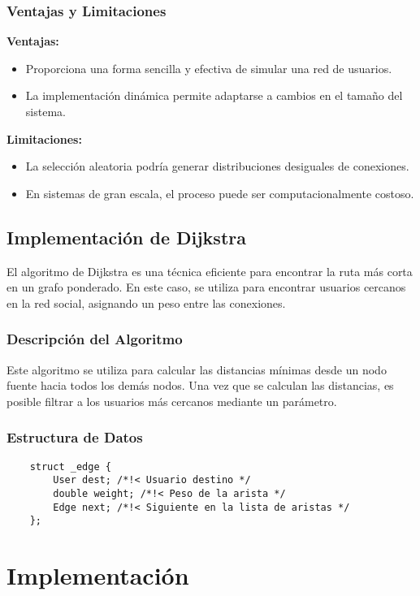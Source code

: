 \documentclass[9pt,letterpaper,onecolumn]{rho-class/rho}
\begin{document}
    \subsubsection{Ventajas y Limitaciones}
    \textbf{Ventajas:}
    \begin{itemize}
        \item Proporciona una forma sencilla y efectiva de simular una red de usuarios.
        \item La implementación dinámica permite adaptarse a cambios en el tamaño del sistema.
    \end{itemize}
    \textbf{Limitaciones:}
    \begin{itemize}
        \item La selección aleatoria podría generar distribuciones desiguales de conexiones.
        \item En sistemas de gran escala, el proceso puede ser computacionalmente costoso.
    \end{itemize}

    \subsection{Implementación de Dijkstra}
    El algoritmo de Dijkstra es una técnica eficiente para encontrar la ruta más corta en un grafo ponderado.
    En este caso, se utiliza para encontrar usuarios cercanos en la red social, asignando un peso entre las conexiones. 

    \subsubsection{Descripción del Algoritmo}
    Este algoritmo se utiliza para calcular las distancias mínimas desde un nodo fuente hacia todos los demás nodos. 
    Una vez que se calculan las distancias, es posible filtrar a los usuarios más cercanos mediante un parámetro.

    \subsubsection{Estructura de Datos}
    \begin{verbatim}
    struct _edge {
        User dest; /*!< Usuario destino */
        double weight; /*!< Peso de la arista */
        Edge next; /*!< Siguiente en la lista de aristas */
    };
    \end{verbatim}


\section{Implementación}
\end{document}
